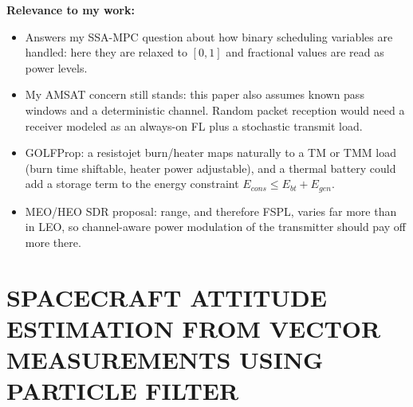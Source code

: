 \documentclass[11pt]{article}
\begin{document}
\textbf{Relevance to my work:}
\begin{itemize}[noitemsep]
    \item Answers my SSA-MPC question about how binary scheduling variables are handled: here they are relaxed to $[0,1]$ and fractional values are read as power levels.
    \item My AMSAT concern still stands: this paper also assumes known pass windows and a deterministic channel. Random packet reception would need a receiver modeled as an always-on FL plus a stochastic transmit load.
    \item GOLFProp: a resistojet burn/heater maps naturally to a TM or TMM load (burn time shiftable, heater power adjustable), and a thermal battery could add a storage term to the energy constraint $E_{cons} \le E_{bt} + E_{gen}$.
    \item MEO/HEO SDR proposal: range, and therefore FSPL, varies far more than in LEO, so channel-aware power modulation of the transmitter should pay off more there.
\end{itemize}

\section{SPACECRAFT ATTITUDE ESTIMATION FROM VECTOR MEASUREMENTS
USING PARTICLE FILTER}
\end{document}
